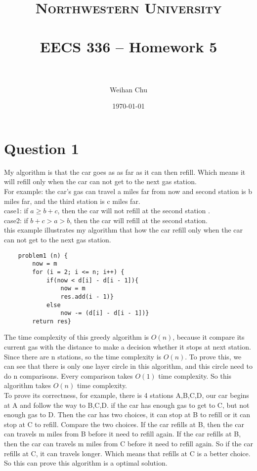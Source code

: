 \documentclass[paper=a4, fontsize=11pt]{scrartcl} %
\title{	
\normalfont \normalsize 
\textsc{Northwestern University} \\ [25pt] %
\horrule{0.5pt} \\[0.4cm] %
\huge EECS 336 -- Homework 5 \\ %
\horrule{2pt} \\[0.5cm] %
}
\author{Weihan Chu} %
\date{\normalsize\today} %
\numberwithin{equation}{section} %
\numberwithin{figure}{section} %
\numberwithin{table}{section} %
\begin{document}
\maketitle %


\section{\textbf{Question 1}}
My algorithm is that the car goes as as far as it can then refill. Which means it will refill only when the car can not get to the next gas station. \\
For example: the car's gas can travel a miles far from now and second station is b miles far, and the third station is c miles far.\\
case1: if $a\geq b+c$, then the car will not refill at the second station .\\
case2: if  $b+c>a>b$, then the car will refill at the second station.\\
this example illustrates my algorithm that how the car refill only when the car can not get to the next gas station.\\
\begin{verbatim}
    problem1 (n) {
        now = m
        for (i = 2; i <= n; i++) {
            if(now < d[i] - d[i - 1]){
                now = m
                res.add(i - 1)}
            else
                now -= (d[i] - d[i - 1])}
        return res}
\end{verbatim}
The time complexity of this greedy algorithm is $O(n)$, because it compare its current gas with the distance to make a decision whether it stops at next station. Since there are n stations, so the time complexity is $O(n)$. To prove this, we can see that there is only one layer circle in this algorithm, and this circle need to do n comparisons. Every comparison takes $O(1)$ time complexity. So this algorithm takes $O(n)$ time complexity. \\
To prove its correctness, for example, there is 4 stations A,B,C,D, our car begins at A and follow the way to B,C,D. if the car has enough gas to get to C, but not enough gas to D. Then the car has two choices, it can stop at B to refill or it can stop at C to refill. Compare the two choices. If the car refills at B, then the car can travels m miles from B before it need to refill again. If the car refills at B, then the car can travels m miles from C before it need to refill again. So if the car refills at C, it can travels longer. Which means that refills at C is a better choice. So this can prove this algorithm is a optimal solution.
\end{document}
